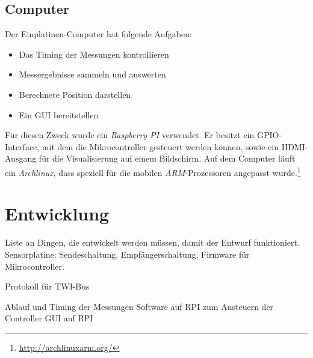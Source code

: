 \subsection{Computer}
Der Einplatinen-Computer hat folgende Aufgaben:
\begin{itemize}
	\item Das Timing der Messungen kontrollieren
	\item Messergebnisse sammeln und auswerten
	\item Berechnete Position darstellen
	\item Ein \ac{GUI} bereitstellen
\end{itemize}
Für diesen Zweck wurde ein \textit{Raspberry PI} verwendet. Er besitzt ein \ac{GPIO}-Interface, mit dem die Mikrocontroller gesteuert werden können, sowie ein \ac{HDMI}-Ausgang für die Visualisierung auf einem Bildschirm. Auf dem Computer läuft ein \textit{Archlinux}, dass speziell für die mobilen \textit{ARM}-Prozessoren angepasst wurde.\footnote{\url{http://archlinuxarm.org/}}



\section{Entwicklung} %
Liste an Dingen, die entwickelt werden müssen, damit der Entwurf funktioniert.
Sensorplatine:
Sendeschaltung,
Empfängerschaltung,
Firmware für Mikrocontroller.

Protokoll für TWI-Bus

Ablauf und Timing der Messungen
Software auf RPI zum Ansteuern der Controller
GUI auf RPI



